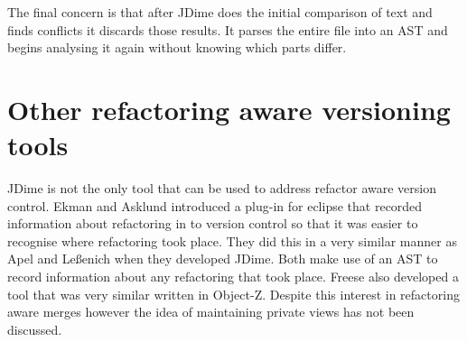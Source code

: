 
The final concern is that after JDime does the initial comparison of text and finds conflicts it discards those results. It parses the entire file into an AST and begins analysing it again without knowing which parts differ.   

\section{Other refactoring aware versioning tools}
JDime is not the only tool that can be used to address refactor aware version control.  Ekman and Asklund \cite{Ekman2004} introduced a plug-in for eclipse that recorded information about refactoring in to version control so that it was easier to recognise where refactoring took place.  They did this in a very similar manner as Apel and Le{\ss}enich when they developed JDime.  Both make use of an AST to record information about any refactoring that took place.  Freese \cite{Freese2006} also developed a tool that was very similar written in Object-Z. Despite this interest in refactoring aware merges however the idea of maintaining private views has not been discussed.
